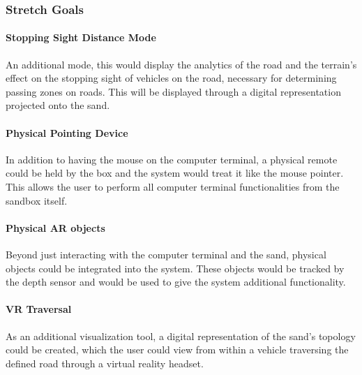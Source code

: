 \documentclass[onecolumn, draftclsnofoot,10pt, compsoc]{IEEEtran}
\begin{document}
\subsubsection{Stretch Goals}
\paragraph{Stopping Sight Distance Mode}
An additional mode, this would display the analytics of the road and the terrain's effect on the stopping sight of vehicles on the road, necessary for determining passing zones on roads. This will be displayed through a digital representation projected onto the sand.
\paragraph{Physical Pointing Device}
In addition to having the mouse on the computer terminal, a physical remote could be held by the box and the system would treat it like the mouse pointer.  This allows the user to perform all computer terminal functionalities from the sandbox itself.

\paragraph{Physical AR objects}
Beyond just interacting with the computer terminal and the sand, physical objects could be integrated into the system. These objects would be tracked by the depth sensor and would be used to give the system additional functionality.

\paragraph{VR Traversal}
As an additional visualization tool, a digital representation of the sand's topology could be created, which the user could view from within a vehicle traversing the defined road through a virtual reality headset.
\end{document}
